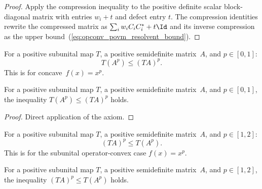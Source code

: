\begin{proof}
    \leanok
    Apply the compression inequality to the positive definite scalar
    block-diagonal matrix with entries $w_i+t$ and defect entry $t$. The
    compression identities rewrite the compressed matrix as
    $\sum_i w_i C_i C_i^\ast + t\Id$ and its inverse compression as the upper
    bound~(\ref{eq:opconv_povm_resolvent_bound}).
\end{proof}

\begin{theorem}\label{thm:posMap_rpow_concave_jensen}
    \notready
    For a positive subunital map $T$, a positive semidefinite matrix~$A$,
    and $p\in[0,1]$:
    \[
        T(A^p) \le (TA)^p.
    \]
    This is \cite[Theorem~5.13]{Wolf2012Quantum} for concave~$f(x)=x^p$.
\end{theorem}

\begin{theorem}\label{thm:rpow_concave_jensen}
    \leanok
    For a positive subunital map $T$, a positive semidefinite matrix~$A$,
    and $p\in[0,1]$, the inequality
    $T(A^p) \le (TA)^p$ holds.
\end{theorem}

\begin{proof}\leanok
    Direct application of the axiom.
\end{proof}

\begin{theorem}\label{thm:posMap_rpow_convex_jensen}
    \notready
    For a positive subunital map $T$, a positive semidefinite matrix~$A$,
    and $p\in[1,2]$:
    \[
        (TA)^p \le T(A^p).
    \]
    This is \cite[Theorem~5.11]{Wolf2012Quantum} for the subunital
    operator-convex case $f(x)=x^p$.
\end{theorem}

\begin{theorem}\label{thm:rpow_convex_jensen}
    \leanok
    For a positive subunital map $T$, a positive semidefinite matrix~$A$,
    and $p\in[1,2]$, the inequality
    $(TA)^p \le T(A^p)$ holds.
\end{theorem}

